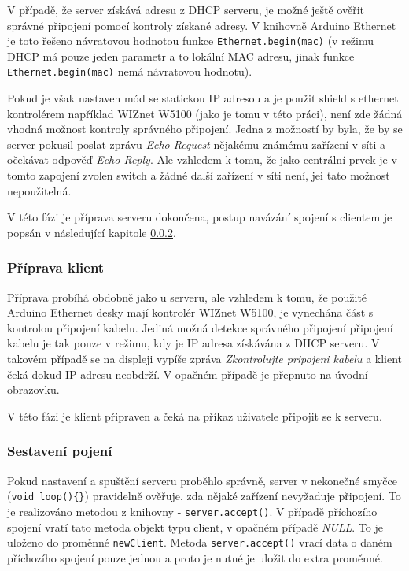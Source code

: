 V případě, že server získává adresu z DHCP serveru, je možné ještě ověřit správné připojení pomocí kontroly získané adresy. V knihovně Arduino Ethernet \cite{EthLib} je toto řešeno návratovou hodnotou funkce \texttt{Ethernet.begin(mac)} (v režimu DHCP má pouze jeden parametr a to lokální MAC adresu, jinak funkce \texttt{Ethernet.begin(mac)} nemá návratovou hodnotu).

Pokud je však nastaven mód se statickou IP adresou a je použit shield s ethernet kontrolérem například WIZnet W5100 (jako je tomu v této práci), není zde žádná vhodná možnost kontroly správného připojení. Jedna z možností by byla, že by se server pokusil poslat zprávu \textit{Echo Request} nějakému známému zařízení v síti a očekávat odpověď \textit{Echo Reply}. Ale vzhledem k tomu, že jako centrální prvek je v tomto zapojení zvolen switch a žádné další zařízení v síti není, jei tato možnost nepoužitelná.

V této fázi je příprava serveru dokončena, postup navázání spojení s clientem je popsán v následující kapitole \ref{sec:connection_communication}.




\subsubsection{Příprava klient}
Příprava probíhá obdobně jako u serveru, ale vzhledem k tomu, že použité Arduino Ethernet desky mají kontrolér WIZnet W5100, je vynechána část s kontrolou připojení kabelu. Jediná možná detekce správného připojení připojení kabelu je tak pouze v režimu, kdy je IP adresa získávána z DHCP serveru. V takovém případě se na displeji vypíše zpráva \textit{Zkontrolujte pripojeni kabelu} a klient čeká dokud IP adresu neobdrží. V opačném případě je přepnuto na úvodní obrazovku.

V této fázi je klient připraven a čeká na příkaz uživatele připojit se k serveru.

\subsubsection{Sestavení pojení}
\label{sec:connection_communication}
Pokud nastavení a spuštění serveru proběhlo správně, server v nekonečné smyčce (\texttt{void loop()\{\}}) pravidelně ověřuje, zda nějaké zařízení nevyžaduje připojení. To je realizováno metodou z knihovny \cite{EthLib} - \texttt{server.accept()}. V případě příchozího spojení vratí tato metoda objekt typu client, v opačném případě \textit{NULL}. To je uloženo do proměnné \texttt{newClient}. Metoda \texttt{server.accept()} vrací data o daném příchozího spojení pouze jednou a proto je nutné je uložit do extra proměnné.

